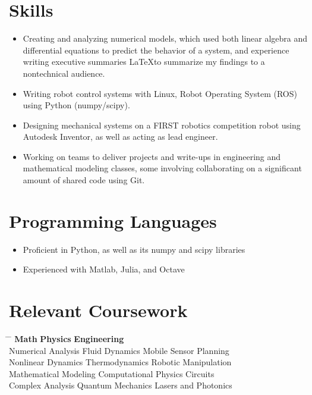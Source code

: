 \documentclass[12pt]{res}
\begin{document}
\begin{resume}
  \section{Skills}
	\noindent
	\begin{itemize}
	\item Creating and analyzing numerical models, which used both 
		linear algebra and differential equations to predict the behavior of a system, 
		and experience writing executive summaries \LaTeX to summarize my findings to a nontechnical audience.
	\item Writing robot control systems with Linux, Robot Operating System
		(ROS) using Python (numpy/scipy).
	\item Designing mechanical systems on a FIRST robotics
		competition robot using Autodesk Inventor, 
		as well as acting as lead engineer.
	\item Working on teams to deliver projects and write-ups
		in engineering and mathematical modeling classes,
		some involving collaborating on a significant amount of shared
		code using Git.
	\end{itemize}

	\section{Programming Languages}
	\noindent
	\begin{itemize}
	\item Proficient in Python, as well as its numpy and scipy libraries
	\item Experienced with Matlab, Julia, and Octave
	\end{itemize}

  \section{Relevant Coursework}
    \vspace{-5pt}
    \begin{tabbing}
      \hspace{2.3in} \= \hspace{2.3in} \= \kill
      {\bf Math}         \> {\bf Physics}      \> {\bf Engineering} \\
      Numerical Analysis \> Fluid Dynamics \> Mobile Sensor Planning \\
      Nonlinear Dynamics \> Thermodynamics \> Robotic Manipulation\\ 
      Mathematical Modeling \> Computational Physics \> Circuits  \\
      Complex Analysis \> Quantum Mechanics \> Lasers and Photonics\\
    \end{tabbing}

\end{resume}
\end{document}
